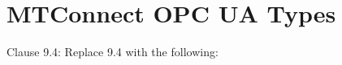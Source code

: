 \documentclass{mtc-opc}	%
\begin{document}


\clearpage

\section{MTConnect OPC UA Types}\label{mtconnect_information_model}
\FloatBarrier

\begin{mdframed}[linecolor=black,backgroundcolor=gray!30]
  Clause 9.4: Replace 9.4 with the following:
\end{mdframed}

\setcounter{subsection}{3}
\setcounter{subsubsection}{0}
\setcounter{figure}{34}
\setcounter{table}{77}



\clearpage

\renewcommand{\appendixname}{Annex}
\begin{appendices}
  
\end{appendices}
\end{document}
